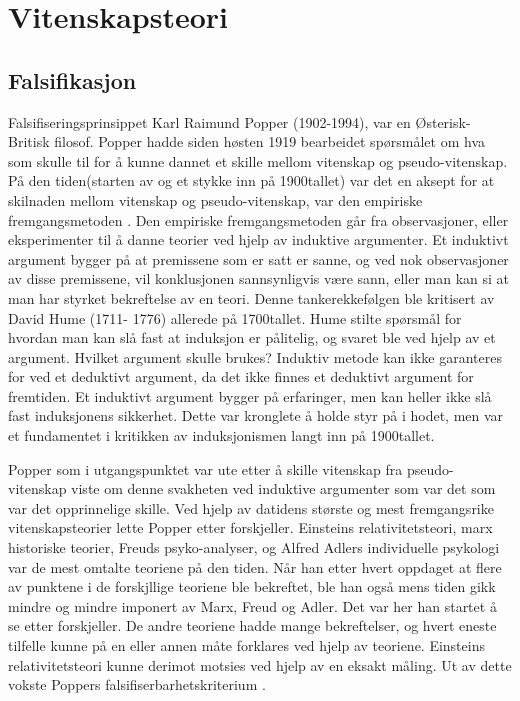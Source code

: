 \documentclass[
]{book}
\begin{document}
\hypertarget{vitenskapsteori}{%
\chapter{Vitenskapsteori}\label{vitenskapsteori}}

\hypertarget{falsifikasjon}{%
\section{Falsifikasjon}\label{falsifikasjon}}

Falsifiseringsprinsippet Karl Raimund Popper (1902-1994), var en Østerisk-Britisk filosof. Popper hadde siden høsten 1919 bearbeidet spørsmålet om hva som skulle til for å kunne dannet et skille mellom vitenskap og pseudo-vitenskap. På den tiden(starten av og et stykke inn på 1900tallet) var det en aksept for at skilnaden mellom vitenskap og pseudo-vitenskap, var den empiriske fremgangsmetoden \citep{popper2002}. Den empiriske fremgangsmetoden går fra observasjoner, eller eksperimenter til å danne teorier ved hjelp av induktive argumenter. Et induktivt argument bygger på at premissene som er satt er sanne, og ved nok observasjoner av disse premissene, vil konklusjonen sannsynligvis være sann, eller man kan si at man har styrket bekreftelse av en teori. Denne tankerekkefølgen ble kritisert av David Hume (1711- 1776) allerede på 1700tallet. Hume stilte spørsmål for hvordan man kan slå fast at induksjon er pålitelig, og svaret ble ved hjelp av et argument. Hvilket argument skulle brukes? Induktiv metode kan ikke garanteres for ved et deduktivt argument, da det ikke finnes et deduktivt argument for fremtiden. Et induktivt argument bygger på erfaringer, men kan heller ikke slå fast induksjonens sikkerhet. Dette var kronglete å holde styr på i hodet, men var et fundamentet i kritikken av induksjonismen langt inn på 1900tallet.

Popper som i utgangspunktet var ute etter å skille vitenskap fra pseudo-vitenskap viste om denne svakheten ved induktive argumenter som var det som var det opprinnelige skille. Ved hjelp av datidens største og mest fremgangsrike vitenskapsteorier lette Popper etter forskjeller. Einsteins relativitetsteori, marx historiske teorier, Freuds psyko-analyser, og Alfred Adlers individuelle psykologi var de mest omtalte teoriene på den tiden. Når han etter hvert oppdaget at flere av punktene i de forskjllige teoriene ble bekreftet, ble han også mens tiden gikk mindre og mindre imponert av Marx, Freud og Adler. Det var her han startet å se etter forskjeller. De andre teoriene hadde mange bekreftelser, og hvert eneste tilfelle kunne på en eller annen måte forklares ved hjelp av teoriene. Einsteins relativitetsteori kunne derimot motsies ved hjelp av en eksakt måling. Ut av dette vokste Poppers falsifiserbarhetskriterium \citep{popper2002}.
\end{document}
